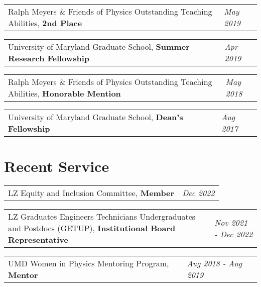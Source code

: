 \documentclass[
  10pt,
  letterpaper,
  DIV=11,
  numbers=noendperiod]{scrartcl}
\begin{document}
\begin{tabularx}{\textwidth}{>{\RaggedRight}p{}  >{\RaggedLeft}X} Ralph Meyers \& Friends of Physics Outstanding Teaching Abilities, \textbf{2nd Place} & \textcolor{mygray}{\textit{May 2019}}  \end{tabularx}

\begin{tabularx}{\textwidth}{>{\RaggedRight}p{}  >{\RaggedLeft}X} University of Maryland Graduate School, \textbf{Summer Research Fellowship} & \textcolor{mygray}{\textit{Apr 2019}}  \end{tabularx}

\begin{tabularx}{\textwidth}{>{\RaggedRight}p{}  >{\RaggedLeft}X} Ralph Meyers \& Friends of Physics Outstanding Teaching Abilities, \textbf{Honorable Mention} & \textcolor{mygray}{\textit{May 2018}}  \end{tabularx}

\begin{tabularx}{\textwidth}{>{\RaggedRight}p{}  >{\RaggedLeft}X} University of Maryland Graduate School, \textbf{Dean's Fellowship} & \textcolor{mygray}{\textit{Aug 2017}}  \end{tabularx}

\hypertarget{fa-people-carry-recent-service}{%
\section{\texorpdfstring{ Recent
Service}{ Recent Service}}\label{fa-people-carry-recent-service}}

\begin{tabularx}{\textwidth}{>{\RaggedRight}p{}  >{\RaggedLeft}X} LZ Equity and Inclusion Committee, \textbf{Member} & \textcolor{mygray}{\textit{Dec 2022}}  \end{tabularx}

\begin{tabularx}{\textwidth}{>{\RaggedRight}p{}  >{\RaggedLeft}X} LZ Graduates Engineers Technicians Undergraduates and Postdocs (GETUP), \textbf{Institutional Board Representative} & \textcolor{mygray}{\textit{Nov 2021 - Dec 2022}}  \end{tabularx}

\begin{tabularx}{\textwidth}{>{\RaggedRight}p{}  >{\RaggedLeft}X} UMD Women in Physics Mentoring Program, \textbf{Mentor} & \textcolor{mygray}{\textit{Aug 2018 - Aug 2019}}  \end{tabularx}
\end{document}

